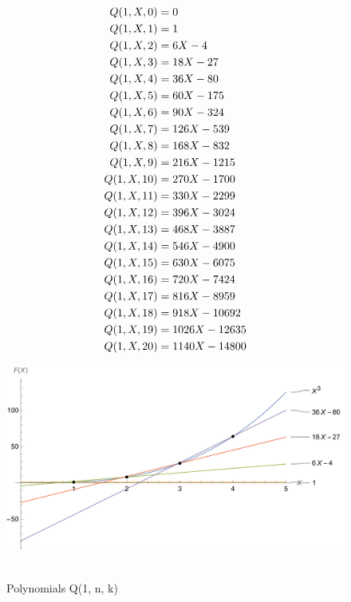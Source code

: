 ﻿\begin{align*}
    {Q}(1,X,0) &= 0 \\
    {Q}(1,X,1) &= 1 \\
    {Q}(1,X,2) &= 6X - 4 \\
    {Q}(1,X,3) &= 18X - 27 \\
    {Q}(1,X,4) &= 36X - 80 \\
    {Q}(1,X,5) &= 60X - 175 \\
    {Q}(1,X,6) &= 90X - 324 \\
    {Q}(1,X,7) &= 126X - 539 \\
    {Q}(1,X,8) &= 168X - 832 \\
    {Q}(1,X,9) &= 216X - 1215 \\
    {Q}(1,X,10) &= 270X - 1700 \\
    {Q}(1,X,11) &= 330X - 2299 \\
    {Q}(1,X,12) &= 396X - 3024 \\
    {Q}(1,X,13) &= 468X - 3887 \\
    {Q}(1,X,14) &= 546X - 4900 \\
    {Q}(1,X,15) &= 630X - 6075 \\
    {Q}(1,X,16) &= 720X - 7424 \\
    {Q}(1,X,17) &= 816X - 8959 \\
    {Q}(1,X,18) &= 918X - 10692 \\
    {Q}(1,X,19) &= 1026X - 12635 \\
    {Q}(1,X,20) &= 1140X - 14800
\end{align*}
\begin{figure}[H]
    \centering
    \includegraphics[width=1\textwidth]{sections/images/02_cubes_with_q_1_n_k}
    ~\caption{Polynomials Q(1, n, k)}\label{fig:figure2}
\end{figure}

